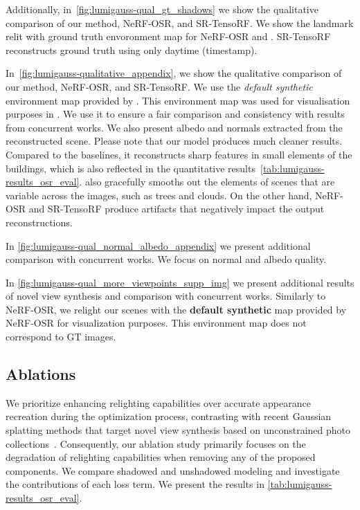     
    Additionally, in~\cref{fig:lumigauss-qual_gt_shadows} we show the qualitative
    comparison of our method, NeRF-OSR, and SR-TensoRF.
    We show the landmark relit with ground truth envoronment map for NeRF-OSR and
    \lumigauss.
    SR-TensoRF reconstructs ground truth using only daytime (timestamp).

    In~\cref{fig:lumigauss-qualitative_appendix}, we show the qualitative
    comparison of our method, NeRF-OSR, and SR-TensoRF.
    We use the \textit{default synthetic} environment map provided by
    \cite{rudnev2022nerfosr}.
    This environment map was used for visualisation purposes in
    \cite{chang2024srtensorf}.
    We use it to ensure a fair comparison and consistency with results from
    concurrent works.
    We also present albedo and normals extracted from the reconstructed scene.
    Please note that our model produces much cleaner results.
    Compared to the baselines, it reconstructs sharp features in small elements of
    the buildings, which is also reflected in the quantitative
    results~\cref{tab:lumigauss-results_osr_eval}.
    \lumigauss also gracefully smooths out the elements of scenes that are variable across the images, such as trees and clouds.
    On the other hand, NeRF-OSR and SR-TensoRF produce artifacts that negatively
    impact the output reconstructions.

    In \cref{fig:lumigauss-qual_normal_albedo_appendix} we present additional
    comparison with concurrent works.
    We focus on normal and albedo quality.
    

    In \cref{fig:lumigauss-qual_more_viewpoints_supp_img} we present additional
    results of novel view synthesis and comparison with concurrent works.
    Similarly to NeRF-OSR, we relight our scenes with the \textbf{default
      synthetic} map provided by NeRF-OSR for visualization purposes.
    This environment map does not correspond to GT images.

  \subsection{Ablations}

    We prioritize enhancing relighting capabilities over accurate appearance
    recreation during the optimization process, contrasting with recent Gaussian
    splatting methods that target novel view synthesis based on unconstrained
    photo
    collections~\cite{xu2024wildgs,dahmani2024swagsplattingwildimages,zhang2024gaussian}.
    Consequently, our ablation study primarily focuses on the degradation of
    relighting capabilities when removing any of the proposed components.
    We compare shadowed and unshadowed modeling and investigate the contributions
    of each loss term.
    We present the results in \cref{tab:lumigauss-results_osr_eval}.

